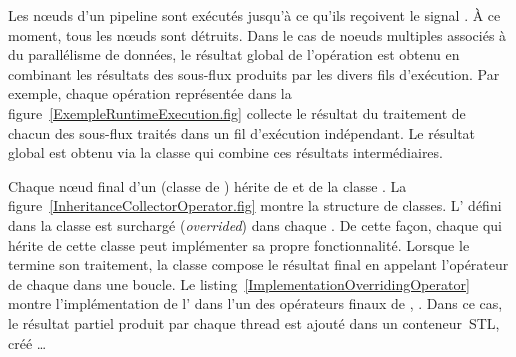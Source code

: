 Les nœuds d'un pipeline sont ex\'ecut\'es jusqu'\`a ce qu'ils re\c coivent le signal . \`A ce moment, tous les nœuds sont d\'etruits. Dans le cas de noeuds multiples associ\'es \`a du parall\'elisme de donn\'ees, le r\'esultat global de l'op\'eration est obtenu en combinant les r\'esultats des sous-flux produits par les divers fils d'ex\'ecution. Par exemple, chaque op\'eration  repr\'esent\'ee dans la figure~\ref{ExempleRuntimeExecution.fig} collecte le r\'esultat du traitement de chacun des sous-flux trait\'es dans un fil d'ex\'ecution ind\'ependant. Le r\'esultat global est obtenu via la classe  qui combine ces r\'esultats interm\'ediaires. 

Chaque nœud final d'un  (classe  de ) h\'erite de  et de la classe . La figure~\ref{InheritanceCollectorOperator.fig} montre la structure de classes. L' d\'efini dans la classe  est surcharg\'e (\emph{overrided}) dans chaque . De cette fa\c {c}on, chaque  qui h\'erite de cette classe peut impl\'ementer sa propre fonctionnalit\'e. Lorsque le  termine son traitement, la classe  compose le r\'esultat final en appelant l'op\'erateur  de chaque  dans une boucle. Le listing~\ref{ImplementationOverridingOperator} montre l'impl\'ementation de l' dans l'un des op\'erateurs finaux de , . Dans ce cas, le r\'esultat partiel produit par chaque thread est ajout\'e dans un conteneur~STL, cr\'e\'e \ldots {}


